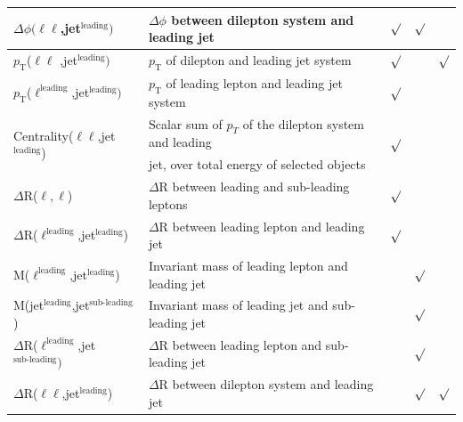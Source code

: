 \begin{table}[h]
{\begin{tabular}{|l|l|c|c|c|}
$\Delta \phi(\ell\ell$,jet$^{\text{leading}})$                   & $\Delta \phi$ between dilepton system and leading jet                                & $\surd$              & $\surd$      &\\ \hline
$p_{\text{T}}$($\ell \ell$ ,jet$^{\text{leading}})$              & $p_{\text{T}}$ of dilepton and leading jet system                                    & $\surd$                  &              & $\surd$ \\ \hline
$p_{\text{T}}$($ \ell^{\text{leading}}$,jet$^{\text{leading}})$  & $p_{\text{T}}$ of leading lepton and leading jet system                              & $\surd$                   &             &\\ \hline
\multirow{2}{*}{Centrality($\ell\ell$,jet$^{\text{leading}}$)}   & Scalar sum of $p_{T}$ of the dilepton system and leading                             & \multirow{2}{*}{$\surd$ } & \multirow{2}{*}{} & \multirow{2}{*}{}\\
                                                                 & jet, over total energy of selected objects                                           &                          &                  &\\ \hline
$\Delta$R($\ell,\ell$)                                           & $\Delta$R between leading and sub-leading leptons                                    & $\surd$                  &              & \\ \hline
$\Delta$R($\ell^{\text{leading}}$,jet$^{\text{leading}}$)        & $\Delta$R between leading lepton and leading jet                                     & $\surd$                  &              &\\ \hline
M($\ell^{\text{leading}}$,jet$^{\text{leading}}$)               & Invariant mass of leading lepton and leading jet                                      &                          & $\surd$      & \\  \hline
M(jet$^{\text{leading}}$,jet$^{\text{sub-leading}}$)            & Invariant mass of leading jet and sub-leading jet                                     &                          & $\surd$      & \\ \hline
$\Delta$R($\ell^{\text{leading}}$,jet$^{\text{sub-leading}})$    & $\Delta$R between leading lepton and sub-leading jet                                 &                          & $\surd$      &  \\ \hline
$\Delta$R($\ell \ell$,jet$^{\text{leading}}$)                    & $\Delta$R between dilepton system and leading jet                                    &                          & $\surd$       &  $\surd$   \\ \hline

\end{tabular}}
\end{table}
